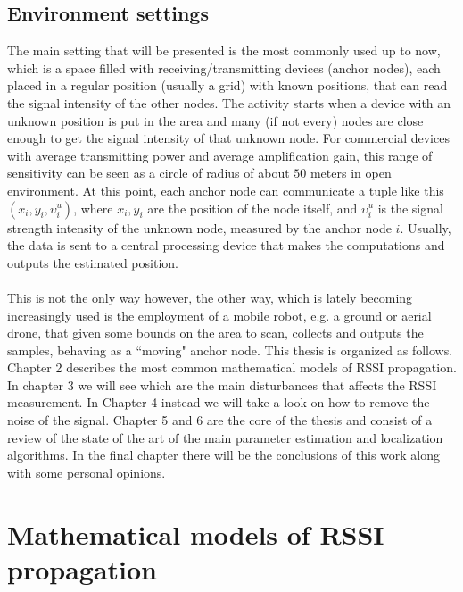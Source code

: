 \documentclass[12pt]{report}
\begin{document}
\section{Environment settings}
The main setting that will be presented is the most commonly used up to now, which is a space filled with receiving/transmitting devices (anchor nodes), each placed in a regular position (usually a grid) with known positions, that can read the signal intensity of the other nodes. The activity starts when a device with an unknown position is put in the area and many (if not every) nodes are close enough to get the signal intensity of that unknown node. For commercial devices with average transmitting power and average amplification gain, this range of sensitivity can be seen as a circle of radius of about $50$ meters in open environment. At this point, each anchor node can communicate a tuple like this $(x_i,y_i,\upsilon_i^u)$, where $x_i,y_i$ are the position of the node itself, and $\upsilon_i^u$ is the signal strength intensity of the unknown node, measured by the anchor node $i$. Usually, the data is sent to a central processing device that makes the computations and outputs the estimated position. \\\\
This is not the only way however, the other way, which is lately becoming increasingly used is the employment of a mobile robot, e.g. a ground or aerial drone, that given some bounds on the area to scan, collects and outputs the samples, behaving as a ``moving" anchor node.
This thesis is organized as follows. Chapter 2 describes the most common mathematical models of RSSI propagation. In chapter 3 we will see which are the main disturbances that affects the RSSI measurement. In Chapter 4 instead we will take a look on how to remove the noise of the signal. Chapter 5 and 6 are the core of the thesis and consist of a review of the state of the art of the main parameter estimation and localization algorithms. In the final chapter there will be the conclusions of this work along with some personal opinions.

\clearpage

\chapter{Mathematical models of RSSI propagation}
\end{document}
